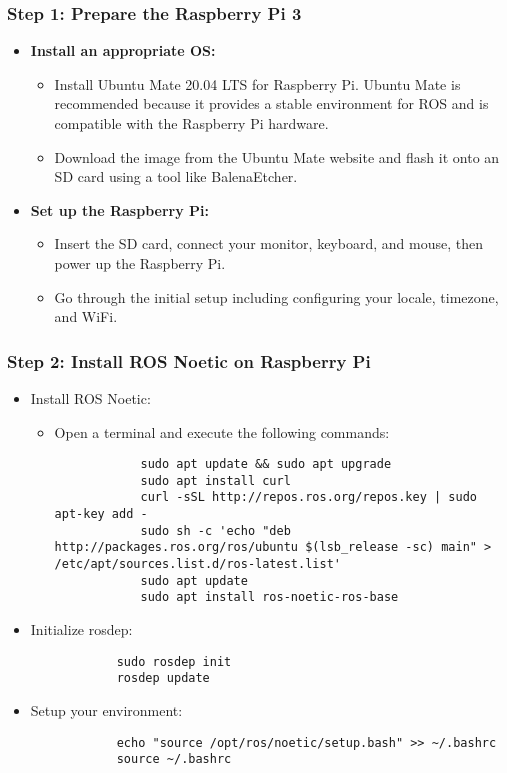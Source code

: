 \documentclass{article}
\begin{document}
	\subsubsection*{Step 1: Prepare the Raspberry Pi 3}
	\begin{itemize}
		\item \textbf{Install an appropriate OS:}
		\begin{itemize}
			\item Install Ubuntu Mate 20.04 LTS for Raspberry Pi. Ubuntu Mate is recommended because it provides a stable environment for ROS and is compatible with the Raspberry Pi hardware.
			\item Download the image from the Ubuntu Mate website and flash it onto an SD card using a tool like BalenaEtcher.
		\end{itemize}
		\item \textbf{Set up the Raspberry Pi:}
		\begin{itemize}
			\item Insert the SD card, connect your monitor, keyboard, and mouse, then power up the Raspberry Pi.
			\item Go through the initial setup including configuring your locale, timezone, and WiFi.
		\end{itemize}
	\end{itemize}
	\subsubsection*{Step 2: Install ROS Noetic on Raspberry Pi}
	\begin{itemize}
		\item Install ROS Noetic:
		\begin{itemize}
			\item Open a terminal and execute the following commands: 
			\begin{verbatim}
			sudo apt update && sudo apt upgrade
			sudo apt install curl
			curl -sSL http://repos.ros.org/repos.key | sudo apt-key add -
			sudo sh -c 'echo "deb http://packages.ros.org/ros/ubuntu $(lsb_release -sc) main" > /etc/apt/sources.list.d/ros-latest.list'
			sudo apt update
			sudo apt install ros-noetic-ros-base
			\end{verbatim}
		\end{itemize}
		\item Initialize rosdep:
		\begin{verbatim}
			sudo rosdep init
			rosdep update
		\end{verbatim}
		\item Setup your environment:
		\begin{verbatim}
			echo "source /opt/ros/noetic/setup.bash" >> ~/.bashrc
			source ~/.bashrc
		\end{verbatim}
	\end{itemize}
\end{document}
